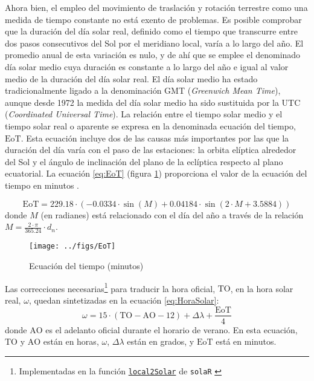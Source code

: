 Ahora bien, el empleo del movimiento de traslación y rotación terrestre
como una medida de tiempo constante no está exento de problemas. Es
posible comprobar que la duración del día solar real, definido como
el tiempo que transcurre entre dos pasos consecutivos del Sol por
el meridiano local, varía a lo largo del año. El promedio anual de
esta variación es nulo, y de ahí que se emplee el denominado día solar
medio cuya duración es constante a lo largo del año e igual al valor
medio de la duración del día solar real. El día solar medio ha estado
tradicionalmente ligado a la denominación GMT (\emph{Greenwich Mean
Time}), aunque desde 1972 la medida del día solar medio ha sido sustituida
por la UTC (\emph{Coordinated Universal Time}). La relación entre
el tiempo solar medio y el tiempo solar real o aparente se expresa
en la denominada ecuación del tiempo, $\mathrm{EoT}$.
Esta ecuación incluye dos de las causas más importantes por las que
la duración del día varía con el paso de las estaciones: la orbita
elíptica alrededor del Sol y el ángulo de inclinación del plano de
la eclíptica respecto al plano ecuatorial. La ecuación \ref{eq:EoT}
(figura \ref{fig:EoT}) proporciona el valor de la ecuación del tiempo
en minutos \cite{Whitman2003}.

\begin{equation}
\mathrm{EoT}=229.18\cdot\left(-0.0334\cdot\sin(M)+0.04184\cdot\sin\left(2\cdot
    M+3.5884\right)\right)\label{eq:EoT}\end{equation}
donde $M$ (en radianes) está relacionado con el día del año a través de la relación
$M=\frac{2\cdot\pi}{365.24}\cdot d_{n}$.

%
\begin{figure}


\begin{centering}
\texttt{[image: ../figs/EoT]}
\end{centering}

\caption{Ecuación del tiempo (minutos)\label{fig:EoT}}



\end{figure}


Las correcciones necesarias\footnote{Implementadas en la función
  \href{http://search.r-project.org/R/library/solaR/html/local2Solar.html}{\texttt{local2Solar}} de \texttt{solaR} \cite{Perpinan2012b}} para traducir la hora oficial, $\mathrm{TO}$,
en la hora solar real, $\omega$, quedan sintetizadas en la ecuación
\ref{eq:HoraSolar}:\begin{equation}
\omega=15\cdot(\mathrm{TO}-\mathrm{AO}-12)+\Delta\lambda+\frac{\mathrm{EoT}}{4}\label{eq:HoraSolar}\end{equation}
donde $\mathrm{AO}$ es el adelanto oficial durante el horario de
verano.
En esta ecuación, $\mathrm{TO}$ y $\mathrm{AO}$ están en horas,
$\omega$, $\Delta\lambda$ están en grados, y $\mathrm{EoT}$ está
en minutos.

